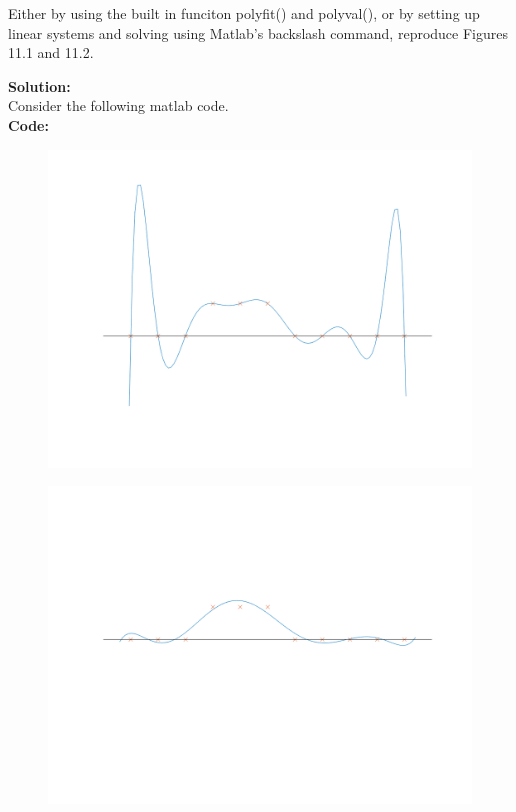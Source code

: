 \documentclass[12pt]{article}
\makeatletter
\theoremstyle{homework}
\newenvironment{exercise}[1]
{\def\@currentlabel{#1}\exercisecore}
{\endexercisecore}
\newcommand{\localhead}[1]{\par\smallskip\noindent\textbf{#1}\nobreak\\}%
\newcommand\solution{\localhead{Solution:}}
\makeatother
\begin{document}
\vspace{1in}





\begin{exercise}{P16} Either by using the built in funciton polyfit() and polyval(), or by setting up linear systems
  and solving using Matlab's backslash command, reproduce Figures 11.1 and 11.2.\\
  \solution  Consider the following matlab code.\\
  \textbf{Code:}
  \begin{center}
    
  \end{center} 
  \begin{figure}[H]
    \begin{center}
    \includegraphics[width = \textwidth]{plot2.png}
    \end{center}
  \end{figure}
  \begin{figure}[H]
    \begin{center}
    \includegraphics[width = \textwidth]{plot3.png}
    \end{center}
  \end{figure}



  
\end{exercise}
\end{document}
